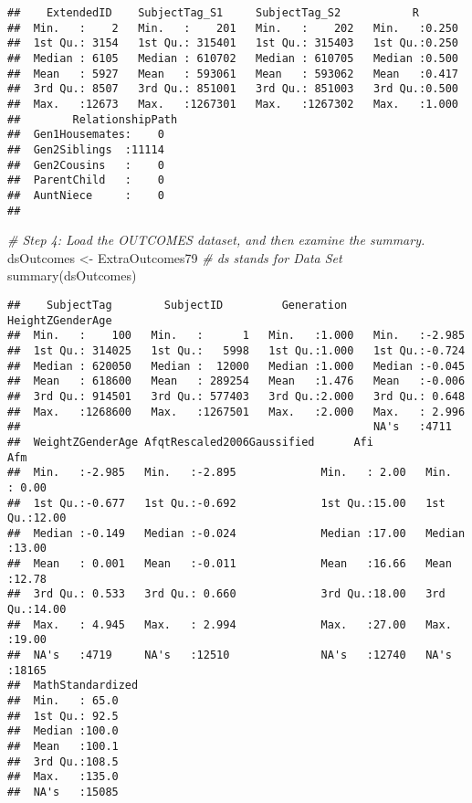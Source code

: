 \documentclass[smallextended]{svjour3}       %
\newenvironment{Shaded}{\begin{snugshade}}{\end{snugshade}}
\newcommand{\CommentTok}[1]{\textcolor[rgb]{0.56,0.35,0.01}{\textit{#1}}}
\newcommand{\FunctionTok}[1]{\textcolor[rgb]{0.00,0.00,0.00}{#1}}
\newcommand{\NormalTok}[1]{#1}
\newcommand{\OtherTok}[1]{\textcolor[rgb]{0.56,0.35,0.01}{#1}}
\begin{document}
\begin{verbatim}
##    ExtendedID    SubjectTag_S1     SubjectTag_S2           R        
##  Min.   :    2   Min.   :    201   Min.   :    202   Min.   :0.250  
##  1st Qu.: 3154   1st Qu.: 315401   1st Qu.: 315403   1st Qu.:0.250  
##  Median : 6105   Median : 610702   Median : 610705   Median :0.500  
##  Mean   : 5927   Mean   : 593061   Mean   : 593062   Mean   :0.417  
##  3rd Qu.: 8507   3rd Qu.: 851001   3rd Qu.: 851003   3rd Qu.:0.500  
##  Max.   :12673   Max.   :1267301   Max.   :1267302   Max.   :1.000  
##        RelationshipPath
##  Gen1Housemates:    0  
##  Gen2Siblings  :11114  
##  Gen2Cousins   :    0  
##  ParentChild   :    0  
##  AuntNiece     :    0  
## 
\end{verbatim}

\begin{Shaded}
\begin{Highlighting}[]
\CommentTok{\# Step 4: Load the OUTCOMES dataset, and then examine the summary.}
\NormalTok{dsOutcomes }\OtherTok{\textless{}{-}}\NormalTok{ ExtraOutcomes79 }\CommentTok{\# ds stands for Data Set}
\FunctionTok{summary}\NormalTok{(dsOutcomes)}
\end{Highlighting}
\end{Shaded}

\begin{verbatim}
##    SubjectTag        SubjectID         Generation    HeightZGenderAge
##  Min.   :    100   Min.   :      1   Min.   :1.000   Min.   :-2.985  
##  1st Qu.: 314025   1st Qu.:   5998   1st Qu.:1.000   1st Qu.:-0.724  
##  Median : 620050   Median :  12000   Median :1.000   Median :-0.045  
##  Mean   : 618600   Mean   : 289254   Mean   :1.476   Mean   :-0.006  
##  3rd Qu.: 914501   3rd Qu.: 577403   3rd Qu.:2.000   3rd Qu.: 0.648  
##  Max.   :1268600   Max.   :1267501   Max.   :2.000   Max.   : 2.996  
##                                                      NA's   :4711    
##  WeightZGenderAge AfqtRescaled2006Gaussified      Afi             Afm       
##  Min.   :-2.985   Min.   :-2.895             Min.   : 2.00   Min.   : 0.00  
##  1st Qu.:-0.677   1st Qu.:-0.692             1st Qu.:15.00   1st Qu.:12.00  
##  Median :-0.149   Median :-0.024             Median :17.00   Median :13.00  
##  Mean   : 0.001   Mean   :-0.011             Mean   :16.66   Mean   :12.78  
##  3rd Qu.: 0.533   3rd Qu.: 0.660             3rd Qu.:18.00   3rd Qu.:14.00  
##  Max.   : 4.945   Max.   : 2.994             Max.   :27.00   Max.   :19.00  
##  NA's   :4719     NA's   :12510              NA's   :12740   NA's   :18165  
##  MathStandardized
##  Min.   : 65.0   
##  1st Qu.: 92.5   
##  Median :100.0   
##  Mean   :100.1   
##  3rd Qu.:108.5   
##  Max.   :135.0   
##  NA's   :15085
\end{verbatim}
\end{document}
